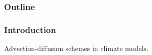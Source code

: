 \documentclass{beamer}
\begin{document}
   \begin{frame}
       \frametitle{Outline}
       \tableofcontents[currentsection]
   \end{frame}

   \begin{frame}
       \frametitle{Introduction}
       Advection-diffusion schemes in climate models.
   \end{frame}
\end{document}
